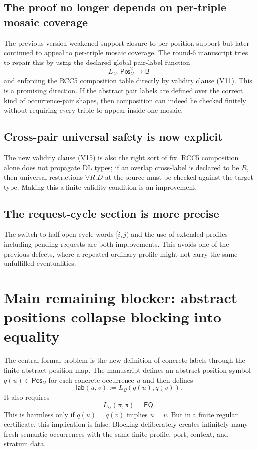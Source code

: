 \documentclass[11pt]{article}
\newcommand{\EQ}{\mathsf{EQ}}
\newcommand{\Base}{\mathsf{B}}
\newcommand{\Q}{\mathcal Q}
\newcommand{\Pos}{\mathsf{Pos}}
\newcommand{\lab}{\mathsf{lab}}
\begin{document}
\subsection{The proof no longer depends on per-triple mosaic coverage}

The previous version weakened support closure to per-position support but later
continued to appeal to per-triple mosaic coverage.  The round-6 manuscript
tries to repair this by using the declared global pair-label function
\[
  L_{\Q}:\Pos_{\Q}^{2}\to\Base
\]
and enforcing the RCC5 composition table directly by validity clause (V11).
This is a promising direction.  If the abstract pair labels are defined over
the correct kind of occurrence-pair shapes, then composition can indeed be
checked finitely without requiring every triple to appear inside one mosaic.

\subsection{Cross-pair universal safety is now explicit}

The new validity clause (V15) is also the right sort of fix.  RCC5 composition
alone does not propagate DL types; if an overlap cross-label is declared to be
$R$, then universal restrictions $\forall R.D$ at the source must be checked
against the target type.  Making this a finite validity condition is an
improvement.

\subsection{The request-cycle section is more precise}

The switch to half-open cycle words $[i,j)$ and the use of extended profiles
including pending requests are both improvements.  This avoids one of the
previous defects, where a repeated ordinary profile might not carry the same
unfulfilled eventualities.

\section{Main remaining blocker: abstract positions collapse blocking into equality}
\label{sec:diagonal}

The central formal problem is the new definition of concrete labels through the
finite abstract position map.  The manuscript defines an abstract position
symbol $q(u)\in\Pos_{\Q}$ for each concrete occurrence $u$ and then defines
\[
  \lab(u,v):=L_{\Q}(q(u),q(v)).
\]
It also requires
\[
  L_{\Q}(\pi,\pi)=\EQ.
\]
This is harmless only if $q(u)=q(v)$ implies $u=v$.  But in a finite regular
certificate, this implication is false.  Blocking deliberately creates
infinitely many fresh semantic occurrences with the same finite profile, port,
context, and stratum data.
\end{document}
